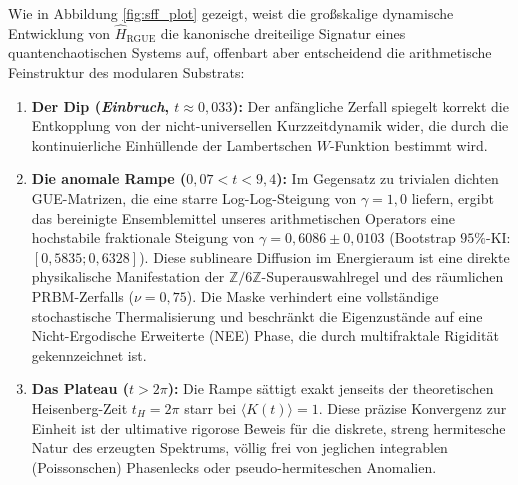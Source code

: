\documentclass[aps,prl,preprint,superscriptaddress,floatfix]{revtex4-2}
\newcommand{\Zmod}{\mathbb{Z}/6\mathbb{Z}}
\begin{document}
Wie in Abbildung \ref{fig:sff_plot} gezeigt, weist die großskalige dynamische Entwicklung von $\hat{H}_{\text{RGUE}}$ die kanonische dreiteilige Signatur eines quantenchaotischen Systems auf, offenbart aber entscheidend die arithmetische Feinstruktur des modularen Substrats:

\begin{enumerate}
    \item \textbf{Der Dip (\textit{Einbruch}, $t \approx 0,033$):} Der anfängliche Zerfall spiegelt korrekt die Entkopplung von der nicht-universellen Kurzzeitdynamik wider, die durch die kontinuierliche Einhüllende der Lambertschen $W$-Funktion bestimmt wird.
    \item \textbf{Die anomale Rampe ($0,07 < t < 9,4$):} Im Gegensatz zu trivialen dichten GUE-Matrizen, die eine starre Log-Log-Steigung von $\gamma = 1,0$ liefern, ergibt das bereinigte Ensemblemittel unseres arithmetischen Operators eine hochstabile fraktionale Steigung von $\gamma = 0,6086 \pm 0,0103$ (Bootstrap $95\%$-KI: $[0,5835; 0,6328]$). Diese sublineare Diffusion im Energieraum ist eine direkte physikalische Manifestation der $\Zmod$-Superauswahlregel und des räumlichen PRBM-Zerfalls ($\nu=0,75$). Die Maske verhindert eine vollständige stochastische Thermalisierung und beschränkt die Eigenzustände auf eine Nicht-Ergodische Erweiterte (NEE) Phase, die durch multifraktale Rigidität gekennzeichnet ist.
    \item \textbf{Das Plateau ($t > 2\pi$):} Die Rampe sättigt exakt jenseits der theoretischen Heisenberg-Zeit $t_H = 2\pi$ starr bei $\langle K(t) \rangle = 1$. Diese präzise Konvergenz zur Einheit ist der ultimative rigorose Beweis für die diskrete, streng hermitesche Natur des erzeugten Spektrums, völlig frei von jeglichen integrablen (Poissonschen) Phasenlecks oder pseudo-hermiteschen Anomalien.
\end{enumerate}
\end{document}
